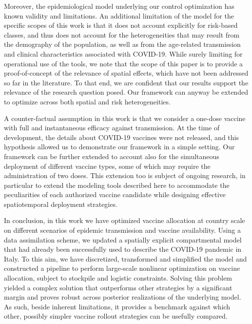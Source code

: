 Moreover, the epidemiological model underlying our control optimization has known validity and limitations\cite[-3\baselineskip]{Gatto:SpreadDynamicsCOVID19:2020, Bertuzzo:GeographyCOVID19Spread:2020}. An additional limitation of the model for the specific scopes of this work is that it does not account explicitly for risk-based classes, and thus does not account for the heterogeneities that may result from the demography of the population, as well as from the age-related transmission and clinical characteristics associated with COVID-19. While surely limiting for operational use of the tools, we note that the scope of this paper is to provide a proof-of-concept of the relevance of spatial effects, which have not been addressed so far in the literature. To that end, we are confident that our results support the relevance of the research question posed. Our framework can anyway be extended to optimize across both spatial and risk heterogeneities. 

A counter-factual assumption in this work is that we consider a one-dose vaccine with full and instantaneous efficacy against transmission. At the time of development, the details about COVID-19 vaccines were not released, and this hypothesis allowed us to demonstrate our framework in a simple setting. Our framework can be further extended to account also for the simultaneous deployment of different vaccine types, some of which may require the administration of two doses. This extension too is subject of ongoing research, in particular to extend the modeling tools described here to accommodate the peculiarities of each authorized vaccine candidate while designing effective spatiotemporal deployment strategies.

In conclusion, in this work we have optimized vaccine allocation at country scale on different scenarios of epidemic transmission and vaccine availability. Using a data assimilation scheme, we updated a spatially explicit compartmental model that had already been successfully used to describe the COVID-19 pandemic in Italy. To this aim, we have discretized, transformed and simplified the model and constructed a pipeline to perform large-scale nonlinear optimization on vaccine allocation, subject to stockpile and logistic constraints. Solving this problem yielded a complex solution that outperforms other strategies by a significant margin and proves robust across posterior realizations of the underlying model. As such, beside inherent limitations, it provides a benchmark against which other, possibly simpler vaccine rollout strategies can be usefully compared.

